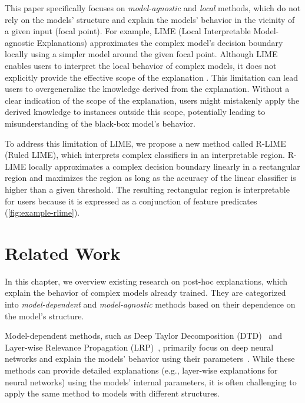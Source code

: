 \documentclass[11pt]{article}
\begin{document}
This paper specifically focuses
on \emph{model-agnostic} and \emph{local} methods,
which do not rely on the models' structure
and explain the models' behavior
in the vicinity of a given input (focal point).
For example, LIME (Local Interpretable Model-agnostic Explanations)
\cite{ribeiro2016why} approximates the complex model's decision boundary
locally using a simpler model around the given focal point.
Although LIME enables users to interpret the local behavior of complex models,
it does not explicitly provide the effective scope of the explanation
\cite{ribeiro2018anchors}.
This limitation can lead
users to overgeneralize the knowledge derived from the explanation.
Without a clear indication of the scope of the explanation,
users might mistakenly apply
the derived knowledge to instances outside this scope,
potentially leading to misunderstanding of the black-box model's behavior.

To address this limitation of LIME,
we propose a new method called R-LIME (Ruled LIME),
which interprets complex classifiers in an interpretable region.
R-LIME locally approximates a complex decision boundary linearly
in a rectangular region and maximizes the region
as long as the accuracy of the linear classifier is
higher than a given threshold.
The resulting rectangular region is interpretable for users because it is
expressed as a conjunction of feature predicates (\cref{fig:example-rlime}).

\section{Related Work}
In this chapter,
we overview existing research on post-hoc explanations,
which explain the behavior of complex models already trained.
They are categorized
into \emph{model-dependent} and \emph{model-agnostic} methods
based on their dependence on the model's structure.

Model-dependent methods,
such as Deep Taylor Decomposition (DTD)~\cite{montavon2017explaining}
and Layer-wise Relevance Propagation (LRP)~\cite{bach2015pixel},
primarily focus on deep neural networks and
explain the models' behavior using their parameters~\cite{samek2021explaining}.
While these methods can provide detailed explanations
(e.g., layer-wise explanations for neural networks)
using the models' internal parameters,
it is often challenging
to apply the same method to models with different structures.
\end{document}
